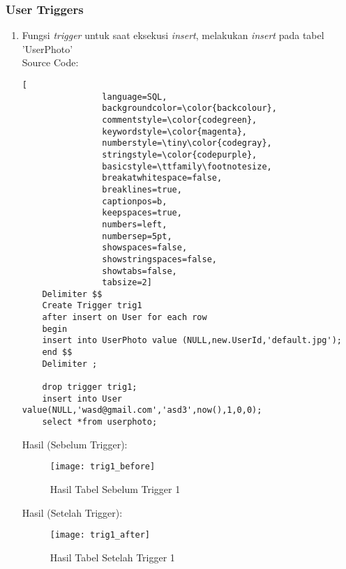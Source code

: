 \subsubsection{User Triggers}
\begin{enumerate}
	\item	Fungsi \textit{trigger} untuk saat eksekusi \textit{insert}, melakukan \textit{insert} pada tabel 'UserPhoto' \\
			Source Code:
			\begin{lstlisting}[
				language=SQL,
				backgroundcolor=\color{backcolour},   
				commentstyle=\color{codegreen},
				keywordstyle=\color{magenta},
				numberstyle=\tiny\color{codegray},
				stringstyle=\color{codepurple},
				basicstyle=\ttfamily\footnotesize,
				breakatwhitespace=false,         
				breaklines=true,                 
				captionpos=b,                    
				keepspaces=true,                 
				numbers=left,                    
				numbersep=5pt,                  
				showspaces=false,                
				showstringspaces=false,
				showtabs=false,                  
				tabsize=2]
	Delimiter $$
	Create Trigger trig1
	after insert on User for each row 
	begin
	insert into UserPhoto value (NULL,new.UserId,'default.jpg');
	end $$
	Delimiter ;
	
	drop trigger trig1;
	insert into User value(NULL,'wasd@gmail.com','asd3',now(),1,0,0);
	select *from userphoto;
			\end{lstlisting}
		Hasil (Sebelum Trigger):
		\\
		\begin{figure}[H]
			\centering
			\texttt{[image: trig1\_before]}
			\caption{Hasil Tabel Sebelum Trigger 1}
		\end{figure}
		Hasil (Setelah Trigger):
		\begin{figure}[H]
			\centering
			\texttt{[image: trig1\_after]}
			\caption{Hasil Tabel Setelah Trigger 1}
		\end{figure}
	

\end{enumerate}
